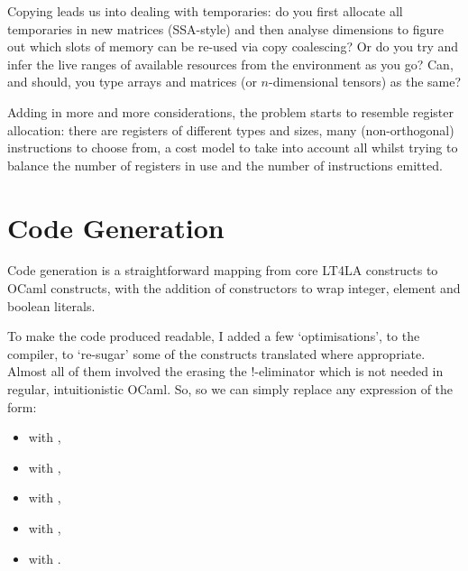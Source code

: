 Copying leads us into dealing with temporaries: do you first allocate all
temporaries in new matrices (SSA-style) and then analyse dimensions to figure
out which slots of memory can be re-used via copy coalescing? Or do you try and
infer the live ranges of available resources from the environment as you go?
Can, and should, you type arrays and matrices (or $n$-dimensional tensors) as
the same?

Adding in more and more considerations, the problem starts to resemble register
allocation: there are registers of different types and sizes, many
(non-orthogonal) instructions to choose from, a cost model to take into account
all whilst trying to balance the number of registers in use and the number of
instructions emitted.

\section{Code Generation}

Code generation is a straightforward mapping from core LT4LA constructs to
OCaml constructs, with the addition of  constructors to wrap
integer, element and boolean literals.

To make the code produced readable, I added a few `optimisations', to the
compiler, to `re-sugar' some of the constructs translated where appropriate.
Almost all of them involved the erasing the !-eliminator which is not needed in
regular, intuitionistic OCaml. So, so we can simply replace any expression of
the form:

\begin{itemize}

    \item {} with
        , 

    \item {} with
        ,

    \item {} with
        ,

    \item {} with ,

    \item {} with
        .

\end{itemize}

